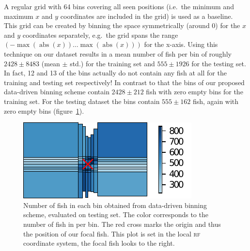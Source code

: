 \documentclass[nobib, a4paper]{tufte-handout}
\begin{document}
A regular grid with 64 bins covering all seen positions (i.e.\ the minimum and maximum $x$ and $y$ coordinates are included in the grid) is used as a baseline.
This grid can be created by binning the space symmetrically (around 0) for the $x$ and $y$ coordinates separately,
e.g.\ the grid spans the range $\left(  -\max(  \operatorname{abs}( x)) \ldots \max ( \operatorname{abs}( x)) \right)$ for the x-axis.
Using this technique on our dataset results in a mean number of fish per bin of roughly \(2428\pm 8483\) (mean $\pm$ std.) for the training set and \(555 \pm 1926\) for the testing set.
In fact, 12 and 13 of the bins actually do not contain any fish at all for the training and testing set respectively!
In contrast to that the bins of our proposed data-driven binning scheme contain $2428 \pm 212$ fish with zero empty bins for the training set.
For the testing dataset the bins contain $555 \pm 162$ fish, again with zero empty bins (figure~\ref{fig:occupancy}).

\begin{figure}[htb]
  \includegraphics{rf_occupancy_test_paper}
   \centering
   \caption{Number of fish in each bin obtained from data-driven binning scheme, evaluated on testing set.
     The color corresponds to the number of fish in per bin.
     The red cross marks the origin and thus the position of our focal fish.
   This plot is set in the local \textsc{rf} coordinate system, the focal fish looks to the right.}
   \label{fig:occupancy}
\end{figure}
\end{document}
